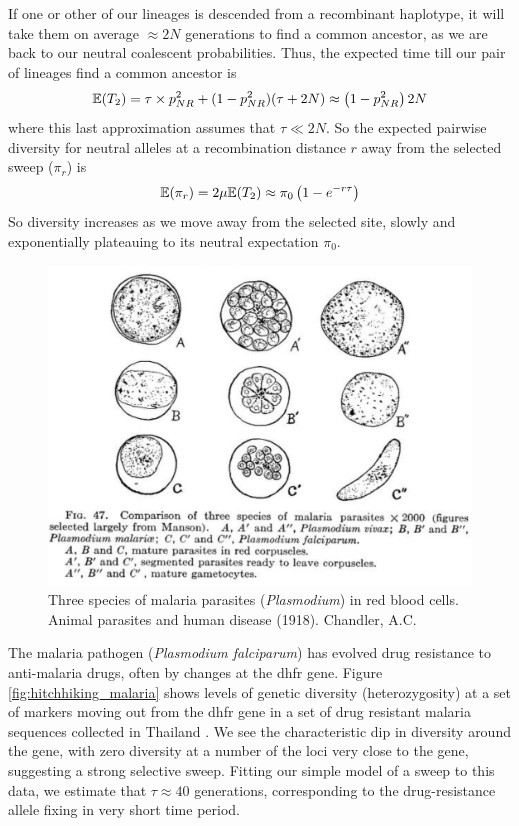 If one or other of our lineages is descended from a recombinant haplotype, it will take them on average
$\approx 2N$ generations to find a common ancestor, as we are back to our
neutral coalescent probabilities. Thus, the expected time
till our pair of lineages find a common ancestor is
\begin{equation}
\mathbb{E}(T_2)  = \tau \times p_{NR}^2 +(1-p_{NR}^2) (\tau +2N) \approx
\left(1-p_{NR}^2 \right) 2N
\end{equation}
where this last approximation assumes that $\tau \ll 2N$. So the
expected pairwise diversity for neutral alleles at a recombination
distance $r$ away from the selected sweep ($\pi_r$) is
\begin{equation}
\mathbb{E}(\pi_r) = 2\mu \mathbb{E}(T_2)  \approx \pi_0 \left(1-e^{-r\tau} \right) \label{eqn:pi_HH}
\end{equation}
So diversity increases as we move away from the selected site,
slowly and exponentially plateauing to its neutral expectation $\pi_0$.\\
\begin{figure}
\begin{center}
\includegraphics[width=\textwidth]{illustration_images/hitchhiking/malaria/malaria.png}
\end{center}
\caption{Three species of malaria parasites ({\it Plasmodium}) in red
  blood cells. Animal parasites and human disease (1918). Chandler, A.C. } \label{fig:malaria}
\end{figure}
The malaria pathogen ({\it Plasmodium falciparum}) has
evolved drug resistance to anti-malaria drugs, often by changes at
the dhfr gene. Figure \ref{fig:hitchhiking_malaria} shows levels of
genetic diversity (heterozygosity) at a set of markers moving out from the dhfr gene in a
set of  drug resistant malaria sequences collected in
Thailand \citep{nash2005selection}. We see the characteristic dip in diversity around the gene,
with zero diversity at a number of the loci very close to the gene,
suggesting a strong selective sweep. Fitting our simple model of a
sweep to this data,  we estimate that $\tau \approx 40$ generations,
corresponding to the drug-resistance allele fixing in very short time period. 

